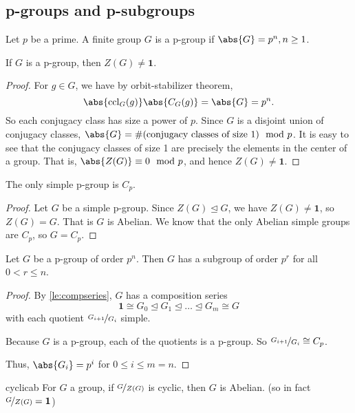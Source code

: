 \subsection{p-groups and p-subgroups}
\leavevmode
\begin{definition}{}{}
    Let \(p\) be a prime. A finite group \(G\) is a p-group if \(\abs{G} = p^n, n\geq 1\).
\end{definition}
\begin{theorem}{}{}
    If \(G\) is a p-group, then \(Z(G) \neq \textbf{1} \).
\end{theorem}
\begin{proof}
    For \(g \in G\), we have by orbit-stabilizer theorem,
    \[\abs{\mathrm{ccl}_G(g)} \abs{C_G(g)} = \abs{G} = p^n.\] 
    So each conjugacy class has size a power of \(p\). Since \(G\) is a disjoint union of conjugacy classes, \(\abs{G}= \# (\text{conjugacy classes of size 1})\mod p\). It is easy to see that the conjugacy classes of size 1 are precisely the elements in the center of a group. That is, \(\abs{Z(G)} \equiv 0 \mod p  \), and hence \(Z(G) \neq \textbf{1}\).
\end{proof}
\begin{corollary} The only simple p-group is \(C_p\).
\end{corollary}
\begin{proof}
    Let \(G\) be a simple p-group. Since \(Z(G) \trianglelefteq G\), we have \(Z(G) \neq \textbf{1} \), so \(Z(G) = G\). That is \(G\) is Abelian. We know that the only Abelian simple groups are \(C_p\), so \(G = C_p\).
\end{proof}
\begin{corollary}{}{}
    Let \(G\) be a p-group of order \(p^n\). Then \(G\) has a subgroup of order \(p^r\) for all \(0 < r \leq n\).
\end{corollary}
\begin{proof}
    By \cref{le:compseries}, \(G\) has a composition series
    \[
        \textbf{1} \cong G_0 \trianglelefteq G_1 \trianglelefteq \ldots \trianglelefteq G_m \cong G
    \]
    with each quotient \(\nicefrac{G_{i+1}}{G_{i}}\) simple.
    
    Because \(G\) is a p-group, each of the quotients is a p-group. So \(\nicefrac{G_{i+1}}{G_i}\cong C_p\).

    Thus, \(\abs{G_i} =p^i\) for \(0\leq i \leq m = n\).
\end{proof}
\begin{lemma}{}{cyclicab}
    For \(G\) a group, if \(\nicefrac{G}{Z(G)}\) is cyclic, then \(G\) is Abelian. (so in fact \(\nicefrac{G}{Z(G)} = \textbf{1} \))
\end{lemma}

